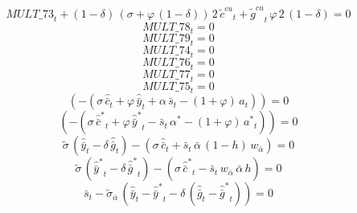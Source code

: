 \begin{dmath}
{MULT\_73}_{t}+\left(1-{{\delta}}\right)\, \left({{\sigma}}+{{\varphi}}\, \left(1-{{\delta}}\right)\right)\, 2\, {{\tilde c^{cu}}}_{t}+{{\tilde g^{cu}}}_{t}\, {{\varphi}}\, 2\, \left(1-{{\delta}}\right)=0
\end{dmath}
\begin{dmath}
{MULT\_78}_{t}=0
\end{dmath}
\begin{dmath}
{MULT\_79}_{t}=0
\end{dmath}
\begin{dmath}
{MULT\_74}_{t}=0
\end{dmath}
\begin{dmath}
{MULT\_76}_{t}=0
\end{dmath}
\begin{dmath}
{MULT\_77}_{t}=0
\end{dmath}
\begin{dmath}
{MULT\_75}_{t}=0
\end{dmath}
\begin{dmath}
\left(-\left({{\sigma}}\, {{\hat {\bar c}}}_{t}+{{\varphi}}\, {{\hat {\bar y}}}_{t}+{{\alpha}}\, {{\bar s}}_{t}-\left(1+{{\varphi}}\right)\, {{a}}_{t}\right)\right)=0
\end{dmath}
\begin{dmath}
\left(-\left({{\sigma}}\, {{\hat {\bar c}^*}}_{t}+{{\varphi}}\, {{\hat {\bar y}^*}}_{t}-{{\bar s}}_{t}\, {{\alpha^*}}-\left(1+{{\varphi}}\right)\, {{a^*}}_{t}\right)\right)=0
\end{dmath}
\begin{dmath}
{{\tilde{\sigma}}}\, \left({{\hat {\bar y}}}_{t}-{{\delta}}\, {{\hat {\bar g}}}_{t}\right)-\left({{\sigma}}\, {{\hat {\bar c}}}_{t}+{{\bar s}}_{t}\, {{\bar{\alpha}}}\, \left(1-{{h}}\right)\, {{w_{\bar{\alpha}}}}\right)=0
\end{dmath}
\begin{dmath}
{{\tilde{\sigma}}}\, \left({{\hat {\bar y}^*}}_{t}-{{\delta}}\, {{\hat {\bar g}^*}}_{t}\right)-\left({{\sigma}}\, {{\hat {\bar c}^*}}_{t}-{{\bar s}}_{t}\, {{w_{\bar{\alpha}}}}\, {{\bar{\alpha}}}\, {{h}}\right)=0
\end{dmath}
\begin{dmath}
{{\bar s}}_{t}-{{\tilde\sigma_{\bar{\alpha}}}}\, \left({{\hat {\bar y}}}_{t}-{{\hat {\bar y}^*}}_{t}-{{\delta}}\, \left({{\hat {\bar g}}}_{t}-{{\hat {\bar g}^*}}_{t}\right)\right)=0
\end{dmath}
